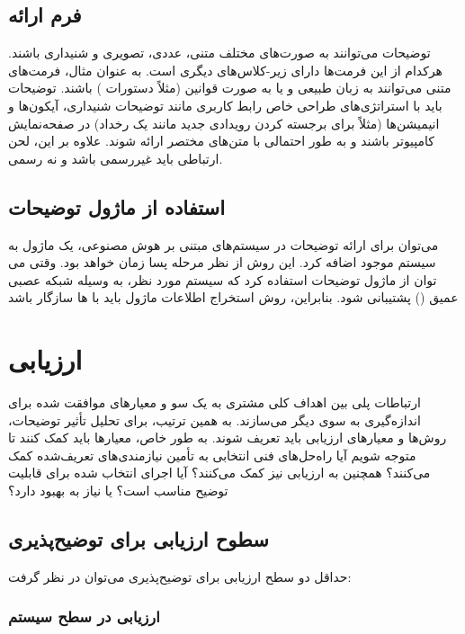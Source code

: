\subsection{فرم ارائه}

توضیحات می‌توانند به صورت‌های مختلف متنی، عددی، تصویری و شنیداری باشند. هرکدام
از این فرمت‌ها دارای زیر-کلاس‌های دیگری است. به عنوان مثال، فرمت‌های متنی
می‌توانند به زبان طبیعی و یا به صورت قوانین (مثلاً دستورات ) باشند. 
توضیحات باید با استراتژی‌های طراحی خاص رابط کاربری مانند توضیحات شنیداری،
آیکون‌ها و انیمیشن‌ها (مثلاً برای برجسته کردن رویدادی جدید مانند یک رخداد) در
صفحه‌نمایش کامپیوتر باشند و به طور احتمالی با متن‌های مختصر ارائه شوند. علاوه بر
این، لحن ارتباطی باید غیررسمی باشد و نه رسمی.

\subsection{استفاده از ماژول توضیحات}

می‌توان برای ارائه توضیحات در سیستم‌های مبتنی بر هوش مصنوعی، یک ماژول به سیستم
موجود اضافه کرد. این روش از نظر مرحله پسا زمان خواهد بود. وقتی می توان از ماژول
توضیحات استفاده کرد که سیستم مورد نظر، به وسیله شبکه عصبی عمیق ()
پشتیبانی ‌شود. بنابراین، روش استخراج اطلاعات ماژول باید با  ها سازگار
باشد

\section{ارزیابی}

ارتباطات پلی بین اهداف کلی مشتری به یک سو و معیارهای موافقت‌ شده برای
اندازه‌گیری به سوی دیگر می‌سازند. به همین ترتیب، برای تحلیل تأثیر توضیحات،
روش‌ها و معیارهای ارزیابی باید تعریف شوند. به طور خاص، معیارها باید کمک کنند تا
متوجه شویم آیا راه‌حل‌های فنی انتخابی به تأمین نیازمندی‌های تعریف‌شده کمک
می‌کنند؟ همچنین به ارزیابی نیز کمک می‌کنند؟ آیا اجرای انتخاب‌ شده برای قابلیت
توضیح مناسب است؟ یا نیاز به بهبود دارد؟

\subsection{سطوح ارزیابی برای توضیح‌پذیری}

حداقل دو سطح ارزیابی برای توضیح‌پذیری می‌توان در نظر گرفت:

\subsubsection{ارزیابی در سطح سیستم}

